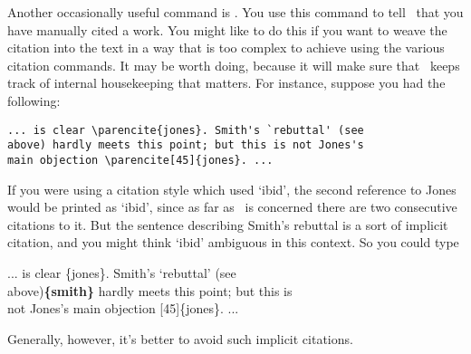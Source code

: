 Another occasionally useful command is . You use this
command to tell \biblatex\ that you have manually cited a work. You
might like to do this if you want to weave the citation into the text
in a way that is too complex to achieve using the various citation
commands. It may be worth doing, because it will make sure that
\biblatex\ keeps track of internal housekeeping that matters. For
instance, suppose you had the following:
\begin{verbatim}
... is clear \parencite{jones}. Smith's `rebuttal' (see
above) hardly meets this point; but this is not Jones's
main objection \parencite[45]{jones}. ...
\end{verbatim}
If you were using a citation style which used `ibid', the second
reference to Jones would be printed as `ibid', since as far as
\biblatex\ is concerned there are two consecutive citations to it. But
the sentence describing Smith's rebuttal is a sort of implicit
citation, and you might think `ibid' ambiguous in this context. So you
could type
\begin{pseudoverb}
... is clear \{jones\}. Smith's `rebuttal' (see\\
above){\bfseries{}\{smith\}} hardly meets this point; but this is\\
not Jones's main objection [45]\{jones\}. ...
\end{pseudoverb}
Generally, however, it's better to avoid such implicit citations.

